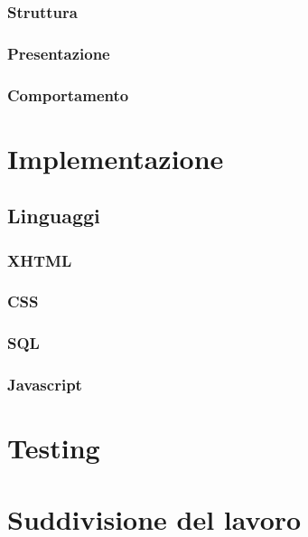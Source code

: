\documentclass[12pt,a4paper,headings=optiontohead]{article}
\begin{document}
\subsubsection{Struttura}
\subsubsection{Presentazione}
\subsubsection{Comportamento}

\section{Implementazione}
\subsection{Linguaggi}
\subsubsection{XHTML}
\subsubsection{CSS}
\subsubsection{SQL}
\subsubsection{Javascript}

\section{Testing}

\section{Suddivisione del lavoro}
\end{document}
